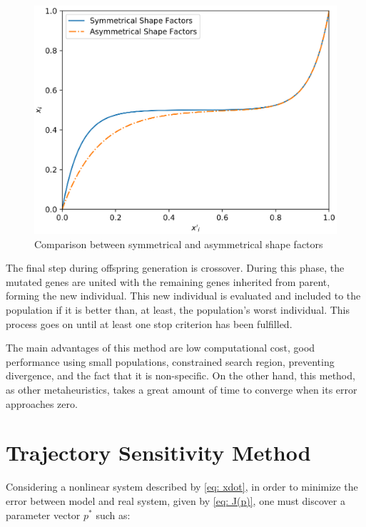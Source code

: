 \begin{figure}[h]
	\caption{Comparison between symmetrical and asymmetrical shape factors}
	\begin{center}
		\includegraphics[scale=.5]{Images/symmetrical_transf.eps}
	\end{center}
	\label{fig: diffs}
\end{figure}

The final step during offspring generation is crossover. During this phase, the mutated genes are united with the remaining genes inherited from parent, forming the new individual. This new individual is evaluated and included to the population if it is better than, at least, the population's worst individual. This process goes on until at least one stop criterion has been fulfilled.

The main advantages of this method are low computational cost, good performance using small populations, constrained search region, preventing divergence, and the fact that it is non-specific. On the other hand, this method, as other metaheuristics, takes a great amount of time to converge when its error approaches zero.

\section{Trajectory Sensitivity Method}

Considering a nonlinear system described by \eqref{eq: xdot}, in order to minimize the error between model and real system, given by \eqref{eq: J(p)}, one must discover a parameter vector $p^{*}$ such as:

